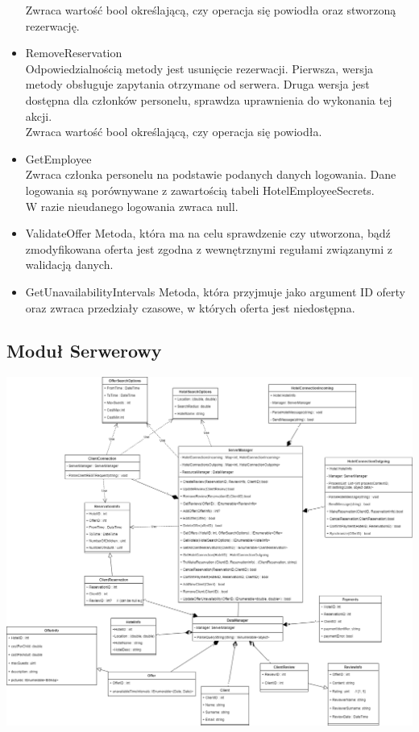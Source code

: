 \documentclass{article}
\begin{document}
\begin{itemize}
    Zwraca wartość bool określającą, czy operacja się powiodła oraz stworzoną rezerwację.
    \item RemoveReservation\\
    Odpowiedzialnością metody jest usunięcie rezerwacji. Pierwsza, wersja metody obsłu\-guje zapytania otrzymane od serwera. Druga  wersja jest dostępna dla członków personelu, sprawdza uprawnienia do wykonania tej akcji.\\
    Zwraca wartość bool określającą, czy operacja się powiodła.
    \item GetEmployee\\
    Zwraca członka personelu na podstawie podanych danych logowania. Dane logowania są porównywane z zawartością tabeli HotelEmployeeSecrets.\\
    W razie nieudanego logowania zwraca null.
    \item ValidateOffer
    Metoda, która ma na celu sprawdzenie czy utworzona, bądź zmodyfikowana oferta jest zgodna z wewnętrznymi regułami związanymi z walidacją danych.
    \item GetUnavailabilityIntervals
    Metoda, która przyjmuje jako argument ID oferty oraz zwraca przedziały czasowe, w których oferta jest niedostępna.
\end{itemize}

\newpage
\subsection{Moduł Serwerowy}
\begin{center}
    \includegraphics[scale=0.34]{checkpoint1/IO Klasy-Server_Module.png}
\end{center}
\end{document}
